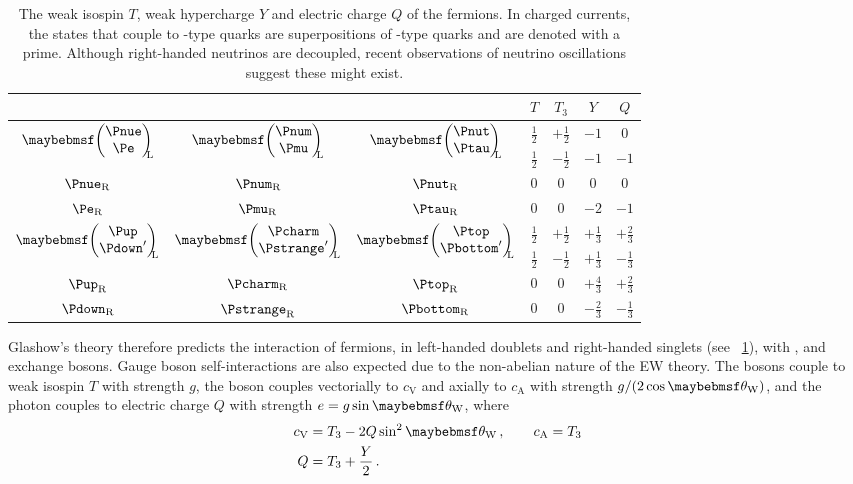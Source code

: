 \begin{table}[t]
	\begin{tabular}{ccc@{\hskip 1cm}cccc}
		\toprule
		& & & $T$ & $T_3$ & $Y$ & $Q$ \\
		\midrule
		\multirow{2}{*}{$\colvector{\Pnue\\ \Pe}_{\!\!\!\text{L}}$} & 
		\multirow{2}{*}{$\colvector{\Pnum\\ \Pmu}_{\!\!\!\text{L}}$} & 
		\multirow{2}{*}{$\colvector{\Pnut\\ \Ptau}_{\!\!\!\text{L}}$} & 
		$\tfrac{1}{2}$ & $+\tfrac{1}{2}$ & $-1$ & 0 \\
		& & & $\tfrac{1}{2}$ & $-\tfrac{1}{2}$ & $-1$ & $-1$ \\
		$\Pnue_{\text{R}}$ & $\Pnum_{\text{R}}$ & $\Pnut_{\text{R}}$ & 0 & 0 & 0 & 0 \\
		$\Pe_{\text{R}}$ & $\Pmu_{\text{R}}$ & $\Ptau_{\text{R}}$ & 0 & 0 & $-2$ & $-1$ \\
		\midrule
		\multirow{2}{*}{$\colvector{\Pup\\ \Pdown'}_{\!\!\!\text{L}}$} & 
		\multirow{2}{*}{$\colvector{\Pcharm\\ \Pstrange'}_{\!\!\!\text{L}}$} & 
		\multirow{2}{*}{$\colvector{\Ptop\\ \Pbottom'}_{\!\!\!\text{L}}$} & 
		$\tfrac{1}{2}$ & $+\tfrac{1}{2}$ & $+\tfrac{1}{3}$ & $+\tfrac{2}{3}$ \\
		& & & $\tfrac{1}{2}$ & $-\tfrac{1}{2}$ & $+\tfrac{1}{3}$ & $-\tfrac{1}{3}$ \\
		$\Pup_{\text{R}}$ & $\Pcharm_{\text{R}}$ & $\Ptop_{\text{R}}$ & 0 & 0 & $+\tfrac{4}{3}$ & $+\tfrac{2}{3}$ \\
		$\Pdown_{\text{R}}$ & $\Pstrange_{\text{R}}$ & $\Pbottom_{\text{R}}$ & 0 & 0 & $-\tfrac{2}{3}$ & $-\tfrac{1}{3}$ \\
		\bottomrule
	\end{tabular}
	\caption{The weak isospin $T$, weak hypercharge $Y$ and electric charge $Q$ of the 
	fermions. In charged currents, the states that couple to \Pup-type 
	quarks are superpositions of \Pdown-type quarks and are denoted with a prime. 
	Although right-handed neutrinos are decoupled, recent observations of neutrino 
	oscillations suggest these might exist.}
	\label{tab:ew_fermions}
\end{table}

Glashow's \EWgroup theory therefore predicts the interaction of fermions, in left-handed 
 doublets and right-handed  singlets (see 
\Table~\ref{tab:ew_fermions}), with \PWpm, \PZ and \Pphoton 
exchange bosons. Gauge boson self-interactions are also expected due to the non-abelian 
nature of the EW theory. The \PWpm bosons couple to weak isospin $T$ with strength 
$g$, the \PZ boson couples vectorially to $c_{\text{V}}$ and axially to $c_{\text{A}}$ 
with strength $g/(2\cos\thetaW)$, and the photon couples to electric charge $Q$ with 
strength $e = g\sin\thetaW$, where
\begin{align}
	c_{\text{V}} &= T_3 - 2 Q \sin^2\thetaW \,,\quad\quad c_{\text{A}} = T_3 \\
	Q   &= T_3 + \frac{Y}{2} \,.
\end{align}

